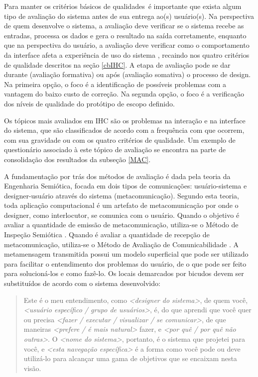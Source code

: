 \indent Para manter os critérios básicos de qualidades\ é importante que exista algum tipo de avaliação do sistema antes de sua entrega ao(s) usuário(s). Na perspectiva de quem desenvolve o sistema, a avaliação deve verificar se o sistema recebe as entradas, processa os dados e gera o resultado na saída corretamente, enquanto que na perspectiva do usuário, a avaliação deve verificar como o comportamento da interface afeta a experiência de uso do sistema \cite[p. 286]{IHCbook}, recaindo nos quatro critérios de qualidade descritos na seção \ref{cbIHC}. A etapa de avaliação pode se dar durante (avaliação formativa) ou após (avaliação somativa) o processo de design. Na primeira opção, o foco é a identificação de possíveis problemas com a vantagem do baixo custo de correção. Na segunda opção, o foco é a verificação dos níveis de qualidade do protótipo de escopo definido. \cite[p. 294]{IHCbook}

\indent Os tópicos mais avaliados em IHC são os problemas na interação e na interface do sistema, que são classificados de acordo com a frequência com que ocorrem, com sua gravidade ou com os quatro critérios de qualidade. Um exemplo de questionário associado à este tópico de avaliação se encontra na parte de consolidação dos resultados da subseção \ref{MAC}.

\indent A fundamentação por trás dos métodos de avaliação é dada pela teoria da Engenharia Semiótica, focada em dois tipos de comunicações: usuário-sistema e designer-usuário através do sistema (metacomunicação). Segundo esta teoria, toda aplicação computacional é um artefato de metacomunicação por onde o designer, como interlocutor, se comunica com o usuário. Quando o objetivo é avaliar a quantidade de emissão de metacomunicação, utiliza-se o Método de Inspeção Semiótica \cite[p. 330]{IHCbook}. Quando é avaliar a quantidade de recepção de metacomunicação, utiliza-se o Método de Avaliação de Comunicabilidade \cite[p. 344]{IHCbook}. A metamensagem transmitida possui um modelo superficial que pode ser utilizado para facilitar o entendimento dos problemas do usuário, de o que pode ser feito para solucioná-los e como fazê-lo. Os locais demarcados por bicudos devem ser substituídos de acordo com o sistema desenvolvido:

\begin{quote}
Este é o meu entendimento, como \textit{<designer do sistema>}, de quem você, \textit{<usuário específico / grupo de usuários>}, é, do que aprendi que você quer ou precisa \textit{<fazer / executar / visualizar / se comunicar>}, de que maneiras \textit{<prefere / é mais natural>} fazer, e \textit{<por quê / por quê não outras>}. O \textit{<nome do sistema>}, portanto, é o sistema que projetei para você, e \textit{<esta navegação específica>} é a forma como você pode ou deve utilizá-lo para alcançar uma gama de objetivos que se encaixam nesta visão.
\end{quote}

